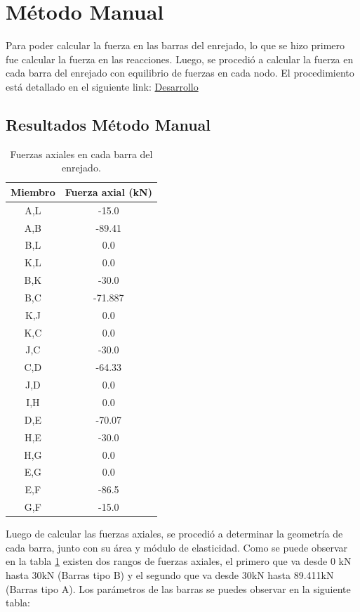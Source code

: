 \documentclass{article}  %
\begin{document}
\newpage
\section{Método Manual}
Para poder calcular la fuerza en las barras del enrejado, lo que se hizo primero fue calcular la fuerza en las reacciones. Luego, se procedió a calcular la fuerza en cada barra del enrejado con equilibrio de fuerzas en cada nodo. El procedimiento está detallado en el siguiente link: \href{https://github.com/berckanala/P2E0_MCOC/tree/main/desarrollo}{Desarrollo}

\subsection{Resultados Método Manual}
\begin{table}[h!]
  \centering
  \begin{tabular}{|c|c|}
  \hline
  \textbf{Miembro} & \textbf{Fuerza axial (kN)} \\
  \hline
  A,L  & -15.0   \\
  A,B  & -89.41 \\
  B,L  & 0.0     \\
  K,L  & 0.0    \\
  B,K  & -30.0   \\
  B,C  & -71.887 \\
  K,J  & 0.0  \\
  K,C  & 0.0   \\
  J,C  & -30.0   \\
  C,D & -64.33 \\
  J,D & 0.0  \\
  I,H & 0.0    \\
  D,E & -70.07 \\
  H,E & -30.0   \\
  H,G & 0.0     \\
  E,G & 0.0    \\
  E,F & -86.5 \\
  G,F & -15.0   \\
  \hline
  \end{tabular}
  \caption{Fuerzas axiales en cada barra del enrejado.}
  \label{tab:1}
\end{table}
Luego de calcular las fuerzas axiales, se procedió a determinar la geometría de cada barra, junto con su área y módulo de elasticidad. Como se puede observar en la tabla \ref{tab:1} existen dos rangos de fuerzas axiales, el primero que va desde 0 kN hasta 30kN (Barras tipo B) y el segundo que va desde 30kN hasta 89.411kN (Barras tipo A). Los parámetros de las barras se puedes observar en la siguiente tabla:
\end{document}
